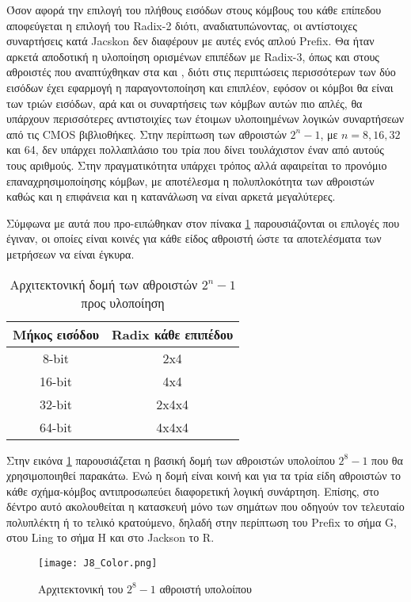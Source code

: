Όσον αφορά την επιλογή του πλήθους εισόδων στους κόμβους του κάθε επίπεδου αποφεύγεται η επιλογή του Radix-2 διότι, αναδιατυπώνοντας, οι αντίστοιχες συναρτήσεις κατά Jacskon δεν διαφέρουν με αυτές ενός απλού Prefix. Θα ήταν αρκετά αποδοτική η υλοποίηση ορισμένων επιπέδων με Radix-3,  όπως και στους αθροιστές που αναπτύχθηκαν στα \cite{6189978} και \cite{6810474}, διότι στις περιπτώσεις περισσότερων των δύο εισόδων έχει εφαρμογή η παραγοντοποίηση και επιπλέον, εφόσον οι κόμβοι θα είναι των τριών εισόδων, αρά και οι συναρτήσεις των κόμβων αυτών πιο απλές, θα υπάρχουν περισσότερες αντιστοιχίες των έτοιμων υλοποιημένων λογικών συναρτήσεων από τις CMOS βιβλιοθήκες. Στην περίπτωση των αθροιστών $2^n-1$, με $n=8, 16, 32$ και 64, δεν υπάρχει πολλαπλάσιο του τρία που δίνει τουλάχιστον έναν από αυτούς τους αριθμούς. Στην πραγματικότητα υπάρχει τρόπος αλλά αφαιρείται το προνόμιο επαναχρησιμοποίησης κόμβων, με αποτέλεσμα η πολυπλοκότητα των αθροιστών καθώς και η επιφάνεια και η κατανάλωση να είναι αρκετά μεγαλύτερες. 

Σύμφωνα με αυτά που προ-ειπώθηκαν στον πίνακα \ref{tb:arch_2^n-1} παρουσιάζονται οι επιλογές που έγιναν, οι οποίες είναι κοινές για κάθε είδος αθροιστή ώστε τα αποτελέσματα των μετρήσεων να είναι έγκυρα.
\begin{table}[H]
\centering
     \begin{tabular}{ || c | c || } 
     \hline
     Μήκος εισόδου & Radix κάθε επιπέδου\\
     \hline\hline
     8-bit  & 2x4 \\
     16-bit & 4x4 \\
     32-bit & 2x4x4 \\
     64-bit & 4x4x4 \\
     \hline
     \end{tabular}
     \caption{Αρχιτεκτονική δομή των αθροιστών $2^n-1$ προς υλοποίηση}
     \label{tb:arch_2^n-1}
\end{table}

Στην εικόνα \ref{2^8-1_Tree_2x4} παρουσιάζεται η βασική δομή των αθροιστών υπολοίπου $2^8-1$ που θα χρησιμοποιηθεί παρακάτω. Ενώ η δομή είναι κοινή και για τα τρία είδη αθροιστών το κάθε σχήμα-κόμβος αντιπροσωπεύει διαφορετική λογική συνάρτηση. Επίσης, στο δέντρο αυτό ακολουθείται η κατασκευή μόνο των σημάτων που οδηγούν τον τελευταίο πολυπλέκτη ή το τελικό κρατούμενο, δηλαδή στην περίπτωση του Prefix το σήμα G, στου Ling το σήμα H και στο Jackson το R.
\begin{figure}[H]
    \centering
    \texttt{[image: J8\_Color.png]}
    \caption{Αρχιτεκτονική του $2^8-1$ αθροιστή υπολοίπου}
    \label{2^8-1_Tree_2x4}
\end{figure}

















